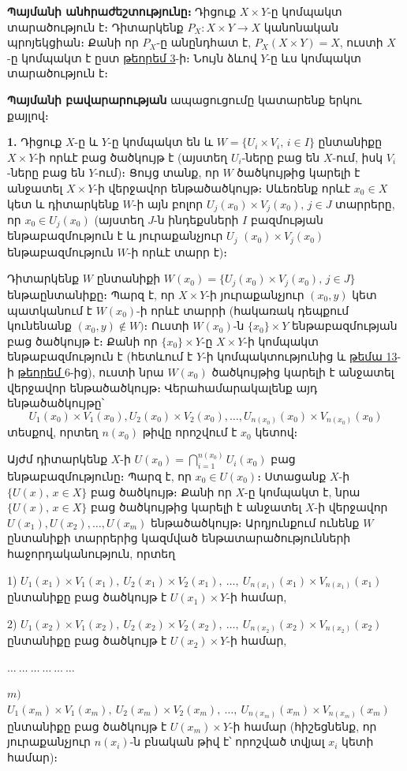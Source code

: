 \documentclass[./main.tex]{subfiles}
\begin{document}
\textbf{Պայմանի անհրաժեշտությունը։} Դիցուք ${X\times Y}$-ը կոմպակտ տարածություն է։ Դիտարկենք ${P_X:X\times Y\rightarrow X}$ կանոնական պրոյեկցիան։ Քանի որ $P_X$-ը անընդհատ է, ${P_X (X\times Y)=X}$, ուստի $X$-ը կոմպակտ է ըստ \hyperref[ch16thm3]{թեորեմ 3}-ի։ Նույն ձևով $Y$-ը ևս կոմպակտ տարածություն է։

\begin{varproof}
\textbf{Պայմանի բավարարության} ապացուցումը կատարենք երկու քայլով։

\par \textbf{1.} Դիցուք $X$-ը և $Y$-ը կոմպակտ են և $W=\{ U_i\times V_i,\, i\in I\}$ ընտանիքը $X\times Y$-ի որևէ բաց ծածկույթ է (այստեղ $U_i$-ները բաց են $X$-ում, իսկ $V_i$-ները բաց են $Y$-ում)։ Ցույց տանք, որ $W$ ծածկույթից կարելի է անջատել $X\times Y$-ի վերջավոր ենթածածկույթ։ Սևեռենք որևէ $x_0\in X$ կետ և դիտարկենք $W$-ի այն բոլոր $U_j (x_0) \times V_j (x_0 ),\, j\in J$ տարրերը, որ $x_0\in U_j (x_0)$ (այստեղ $J$-ն ինդեքսների $I$ բազմության ենթաբազմություն է և յուրաքանչյուր $U_j$ $(x_0)\times V_j(x_0)$ ենթաբազմություն $W$-ի որևէ տարր է)։ 
\par Դիտարկենք $W$ ընտանիքի $W(x_0)=\{ U_j (x_0 )\times V_j (x_0 ),\, j\in J\}$ ենթաընտանիքը։ Պարզ է, որ $X\times Y$-ի յուրաքանչյուր $(x_0,y)$ կետ պատկանում է $W(x_0)$-ի որևէ տարրի (հակառակ դեպքում կունենանք $(x_0,y)\notin W)$։ Ուստի $W(x_0)$-ն $\{ x_0\} \times Y$ ենթաբազ\-մութ\-յան բաց ծածկույթ է։ Քանի որ $\{x_0\}\times Y$-ը $X\times Y$-ի կոմպակտ ենթաբազմություն է (հետևում է $Y$-ի կոմպակտությունից և \hyperlink{sec:13}{թեմա 13}-ի \hyperref[ch13thm6]{թեորեմ $6$}-ից), ուստի նրա $W(x_0)$ ծածկույթից կարելի է անջատել վերջավոր են\-թա\-ծած\-կույթ։ Վերահամարակալենք այդ ենթածածկույթը՝
\[ U_1 (x_0)\times V_1 (x_0), U_2 (x_0)\times V_2 (x_0),\dots,U_{n(x_0)} (x_0)\times V_{n(x_0)}(x_0)\]
տեսքով, որտեղ $n(x_0)$ թիվը որոշվում է $x_0$ կետով։
\par Այժմ դիտարկենք $X$-ի $U(x_0)=\bigcap\limits_{i=1}^{n(x_0)}U_i(x_0)$ բաց ենթաբազմությունը։ Պարզ է, որ $x_0\in U(x_0 )$։ Ստացանք $X$-ի $\{ U(x),\, x\in X\}$ բաց ծածկույթ։ Քանի որ $X$-ը կոմպակտ է, նրա $\{U(x),\, x\in X\}$ բաց ծածկույթից կարելի է անջատել $X$-ի վերջավոր $U(x_1),U(x_2),\dots,U(x_m)$ ենթածածկույթ։ Արդյունքում ունենք $W$ ընտանիքի տար\-րե\-րից կազմված ենթատարածությունների հաջորդականություն, որտեղ
\par
1) $U_1 (x_1)\times V_1(x_1),\ U_2 (x_1)\times V_2(x_1 ),\ \dots,\ U_{n(x_1)}(x_1)\times V_{n(x_1)} (x_1)$ ընտանիքը բաց ծածկույթ է $U(x_1)\times Y$-ի համար,\par 2)
$U_1(x_2)\times V_1 (x_2),\ U_2(x_2 )\times V_2(x_2 ),\ \dots,\ U_{n(x_2)} (x_2)\times V_{n(x_2)} (x_2)$ ընտանիքը բաց ծածկույթ է $U(x_2)\times Y$-ի համար,\par
$\dots\ \dots\ \dots\ \dots\ \dots\ \dots\ $ \par $m)$
$U_1 (x_m)\times V_1(x_m),\ U_2 (x_m )\times V_2(x_m),\ \dots,\ U_{n(x_m)} (x_m)\times V_{n(x_m)}(x_m)$ ընտանիքը բաց ծածկույթ է $U(x_m)\times Y$-ի համար (հիշեցնենք, որ յուրաքանչյուր $n(x_i)$-ն բնա\-կան թիվ է՝ որոշված տվյալ $x_i$ կետի համար)։


\end{varproof}
\end{document}
